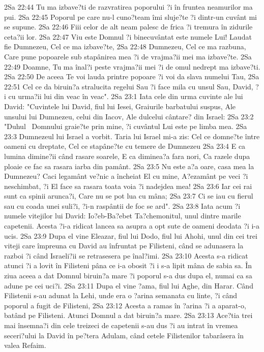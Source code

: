 2Sa 22:44  Tu ma izbave?ti de razvratirea poporului ?i în fruntea neamurilor ma pui.
2Sa 22:45  Poporul pe care nu-l cuno?team îmi sluje?te ?i dintr-un cuvânt mi se supune.
2Sa 22:46  Fiii celor de alt neam palesc de frica ?i tremura în zidurile ceta?ii lor.
2Sa 22:47  Viu este Domnul ?i binecuvântat este numele Lui! Laudat fie Dumnezeu, Cel ce ma izbave?te,
2Sa 22:48  Dumnezeu, Cel ce ma razbuna, Care pune popoarele sub stapânirea mea ?i de vrajma?ii mei ma izbave?te.
2Sa 22:49  Doamne, Tu ma înal?i peste vrajma?ii mei ?i de omul nedrept ma izbave?ti.
2Sa 22:50  De aceea Te voi lauda printre popoare ?i voi da slava numelui Tau,
2Sa 22:51  Cel ce da biruin?a stralucita regelui Sau ?i face mila cu unsul Sau, David, ?i cu urma?ii lui din veac în veac".
2Sa 23:1  Iata cele din urma cuvinte ale lui David: "Cuvintele lui David, fiul lui Iesei, Graiurile barbatului suspus, Ale unsului lui Dumnezeu, celui din Iacov, Ale dulcelui cântare? din Israel:
2Sa 23:2  "Duhul  Domnului graie?te prin mine, ?i cuvântul Lui este pe limba mea.
2Sa 23:3  Dumnezeul lui Israel a vorbit. Taria lui Israel mi-a zis: Cel ce domne?te între oameni cu dreptate, Cel ce stapâne?te cu temere de Dumnezeu
2Sa 23:4  E ca lumina dimine?ii când rasare soarele, E ca diminea?a fara nori, Ca razele dupa ploaie ce fac sa rasara iarba din pamânt.
2Sa 23:5  Nu este a?a oare, casa mea la Dumnezeu? Caci legamânt ve?nic a încheiat El cu mine, A?ezamânt pe veci ?i neschimbat, ?i El face sa rasara toata voia ?i nadejdea mea!
2Sa 23:6  Iar cei rai sunt ca spinii arunca?i, Care nu se pot lua cu mâna;
2Sa 23:7  Ci se iau cu fierul sau cu coada unei suli?i, ?i-n raspântii de foc se ard".
2Sa 23:8  Iata acum ?i numele vitejilor lui David: Io?eb-Ba?ebet Ta?chemonitul, unul dintre marile capetenii. Acesta ?i-a ridicat lancea sa asupra a opt sute de oameni deodata ?i i-a ucis.
2Sa 23:9  Dupa el vine Eleazar, fiul lui Dodo, fiul lui Ahohi, unul din cei trei viteji care împreuna cu David au înfruntat pe Filisteni, când se adunasera la razboi ?i când Israeli?ii se retrasesera pe înal?imi.
2Sa 23:10  Acesta s-a ridicat atunci ?i a lovit în Filisteni pâna ce i-a obosit ?i i s-a lipit mâna de sabia sa. În ziua aceea a dat Domnul biruin?a mare ?i poporul s-a dus dupa el, numai ca sa adune pe cei uci?i.
2Sa 23:11  Dupa el vine ?ama, fiul lui Aghe, din Harar. Când Filistenii s-au adunat la Lehi, unde era o ?arina semanata cu linte, ?i când poporul a fugit de Filisteni,
2Sa 23:12  Acesta a ramas în ?arina ?i a aparat-o, batând pe Filisteni. Atunci Domnul a dat biruin?a mare.
2Sa 23:13  Ace?tia trei mai însemna?i din cele treizeci de capetenii s-au dus ?i au intrat în vremea seceri?ului la David în pe?tera Adulam, când cetele Filistenilor tabarâsera în valea Refaim.
